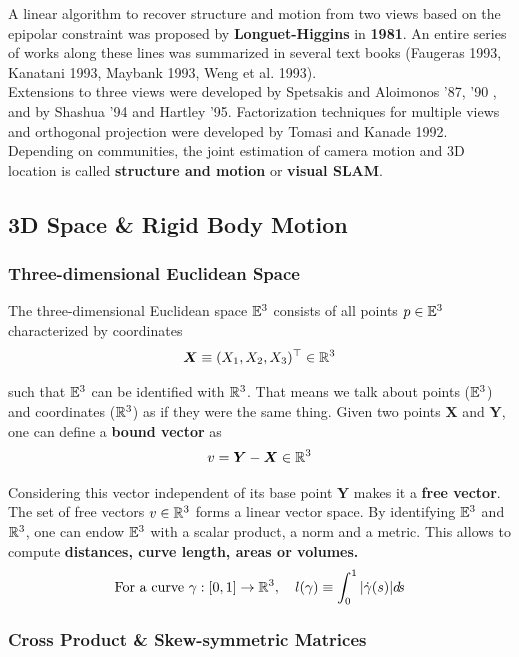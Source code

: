 A linear algorithm to recover structure and motion from two views based
on the epipolar constraint was proposed by \textbf{Longuet-Higgins}
in \textbf{1981}. An entire series of works along these lines was summarized
in several text books (Faugeras 1993, Kanatani 1993,
Maybank 1993, Weng et al. 1993).\\

Extensions to three views were developed by Spetsakis and Aloimonos '87, '90
, and by Shashua '94 and Hartley '95.
Factorization techniques for multiple views and orthogonal projection were
developed by Tomasi and Kanade 1992.\\

Depending on communities, the joint estimation of camera motion and 3D location is called
\textbf{structure and motion} or \textbf{visual SLAM}.

\subsection{3D Space \& Rigid Body Motion}%
\label{sub:3d_space_rigid_body_motion}


\subsubsection{Three-dimensional Euclidean Space}%
\label{ssub:three_dimensional_euclidean_space}

The three-dimensional Euclidean space $\mathbb{E}^3$ consists of all points
$p \in \mathbb{E}^3$ characterized by coordinates
	\[\bm{X} \equiv (X_1, X_2, X_3)^{\top} \in \mathbb{R}^3\]

such that $\mathbb{E}^3$ can be identified with $\mathbb{R}^3$.
That means we talk about points ($\mathbb{E}^3$) and coordinates ($\mathbb{R}^3$)
as if they were the same thing. Given two points $\bm{X}$ and $\bm{Y}$,
one can define a \textbf{bound vector} as
	\[v = \bm{Y} - \bm{X} \in \mathbb{R}^3\]

Considering this vector independent of its base point $\bm{Y}$ makes
it a \textbf{free vector}. The set of free vectors $v \in \mathbb{R}^3$
forms a linear vector space. By identifying $\mathbb{E}^3$ and $\mathbb{R}^3$,
one can endow $\mathbb{E}^3$ with a scalar product, a norm and a metric.
This allows to compute \textbf{distances, curve length, areas or volumes.}
\[\text{For a curve } \gamma : [0,1] \rightarrow \mathbb{R}^3,\quad
	l(\gamma) \equiv \int_{0}^1 | \dot{\gamma}(s) | d\!s\]


\subsubsection{Cross Product \& Skew-symmetric Matrices}%
\label{ssub:cross_product_and_skew_symmetric_matrices}

